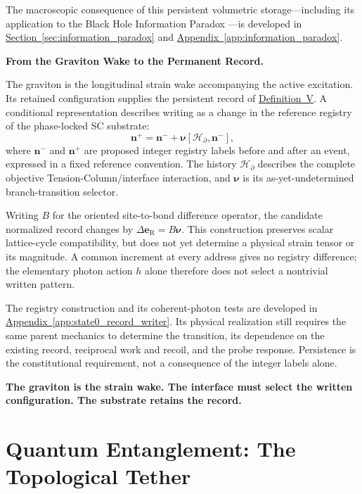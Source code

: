 The macroscopic consequence of this persistent volumetric storage---including its application to the Black Hole Information Paradox \cite{Hawking_1976}---is developed in
\hyperref[sec:information_paradox]{Section~\ref*{sec:information_paradox}}
and
\hyperref[app:information_paradox]{Appendix~\ref*{app:information_paradox}}.

\medskip
\noindent\textbf{From the Graviton Wake to the Permanent Record.}

The graviton is the longitudinal strain wake accompanying the active excitation. Its retained configuration supplies the persistent record of \hyperref[def:definition_five]{Definition~V}. A conditional representation describes writing as a change in the reference registry of the phase-locked SC substrate:
\begin{equation}
    \mathbf n^{+}
    =\mathbf n^{-}
    +\boldsymbol{\nu}[\mathcal H_{\partial},\mathbf n^{-}],
    \label{eq:chapter14_record_update}
\end{equation}
where $\mathbf n^{-}$ and $\mathbf n^{+}$ are proposed integer registry labels before and after an event, expressed in a fixed reference convention. The history $\mathcal H_{\partial}$ describes the complete objective Tension-Column/interface interaction, and $\boldsymbol{\nu}$ is its as-yet-undetermined branch-transition selector.

Writing $B$ for the oriented site-to-bond difference operator, the candidate normalized record changes by $\Delta\mathbf e_{\mathrm R}=B\boldsymbol{\nu}$. This construction preserves scalar lattice-cycle compatibility, but does not yet determine a physical strain tensor or its magnitude. A common increment at every address gives no registry difference; the elementary photon action $h$ alone therefore does not select a nontrivial written pattern.

The registry construction and its coherent-photon tests are developed in \hyperref[app:state0_record_writer]{Appendix~\ref*{app:state0_record_writer}}. Its physical realization still requires the same parent mechanics to determine the transition, its dependence on the existing record, reciprocal work and recoil, and the probe response. Persistence is the constitutional requirement, not a consequence of the integer labels alone.

\noindent\textbf{The graviton is the strain wake. The interface must select the written configuration. The substrate retains the record.}

\section{Quantum Entanglement: The Topological Tether}
\label{sec:quantum_entanglement}

